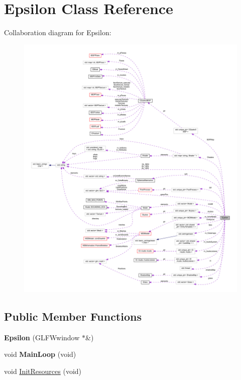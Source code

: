\hypertarget{class_epsilon}{}\section{Epsilon Class Reference}
\label{class_epsilon}


Collaboration diagram for Epsilon\+:
\nopagebreak
\begin{figure}[H]
\begin{center}
\leavevmode
\includegraphics[width=350pt]{class_epsilon__coll__graph}
\end{center}
\end{figure}
\subsection*{Public Member Functions}
\begin{DoxyCompactItemize}
\item 
{\bfseries Epsilon} (G\+L\+F\+Wwindow $\ast$\&)\hypertarget{class_epsilon_a97302c6ca7b7d55d14f9ca742659ddca}{}\label{class_epsilon_a97302c6ca7b7d55d14f9ca742659ddca}

\item 
void {\bfseries Main\+Loop} (void)\hypertarget{class_epsilon_a2c59fe55bdbbfffbd7c3bca0532b4ec4}{}\label{class_epsilon_a2c59fe55bdbbfffbd7c3bca0532b4ec4}

\item 
void \hyperlink{class_epsilon_acdbbc212462949ba9bde213afc7b5a38}{Init\+Resources} (void)
\end{DoxyCompactItemize}
